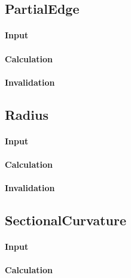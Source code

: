 \bigskip

\subsection{PartialEdge}

\paragraph{Input}

\paragraph{Calculation}

\paragraph{Invalidation}

\bigskip

\subsection{Radius}

\paragraph{Input}

\paragraph{Calculation}

\paragraph{Invalidation}

\bigskip

\subsection{SectionalCurvature}

\paragraph{Input}

\paragraph{Calculation}

